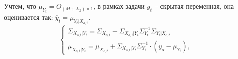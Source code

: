 \documentclass[11pt]{article}
\begin{document}
Учтем, что $\mu_{Y_t} = O_{(M+L_2) \times 1}$, в рамках задачи $y_t$ -- скрытая переменная, она оценивается так: $\hat{y}_t = \mu_{Y_t|X_{o,t}}$.
\begin{equation}
\left\{ \begin{gathered} 
\Sigma_{X_{o,t}|Y_t} = \Sigma_{X_{o,t}}-\Sigma_{X_{o,t}|Y_t}\Sigma_{Y_t}^{-1}\Sigma_{Y_t|X_{o,t}} \\
\mu_{X_{o,t}|Y_t} = \mu_{X_{o,t}} + \Sigma_{X_{o,t}|Y_t}\Sigma_{Y_t}^{-1}\cdot(y_o-\mu_{Y_t}),
\end{gathered} \right.
\end{equation}
\end{document}
